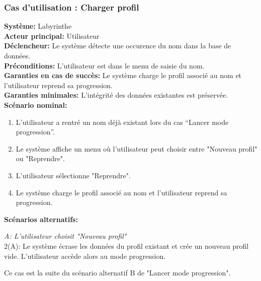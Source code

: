 \documentclass{butexFR}
\begin{document}
\subsubsection{Cas d'utilisation : Charger profil}
\textbf{Système:} Labyrinthe\\
\textbf{Acteur principal:} Utilisateur\\
\textbf{Déclencheur:} Le système détecte une occurence du nom dans la base de données.\\
\textbf{Préconditions:} L'utilisateur est dans le menu de saisie du nom.\\
\textbf{Garanties en cas de succès:} Le système charge le profil associé au nom et l'utilisateur reprend sa progression.\\
\textbf{Garanties minimales:} L'intégrité des données existantes est préservée.\\
\textbf{Scénario nominal:}
\begin{enumerate}
    \item L'utilisateur a rentré un nom déjà existant lors du cas ``Lancer mode progression''.
    \item Le système affiche un menu où l'utilisateur peut choisir entre "Nouveau profil" ou "Reprendre".
    \item L'utilisateur sélectionne "Reprendre".
    \item Le système charge le profil associé au nom et l'utilisateur reprend sa progression.
\end{enumerate}
\textbf{Scénarios alternatifs:} 

\emph{A: L'utilisateur choisit "Nouveau profil"}\\
\hspace*{1em}2(A): Le système écrase les données du profil existant et crée un nouveau profil vide. L'utilisateur accède alors au mode progression.


Ce cas est la suite du scénario alternatif B de "Lancer mode progression".

\newpage
\end{document}
